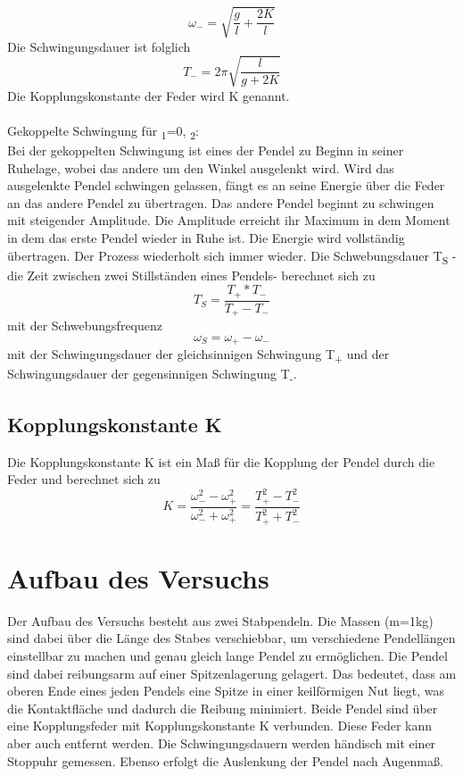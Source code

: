 \documentclass[titlepage=firstcover, captions=tableheading]{scrartcl}
\begin{document}
\begin{displaymath}
    \omega_-=\sqrt{\frac{g}{l}+\frac{2K}{l}}
\end{displaymath}
Die Schwingungsdauer ist folglich
\begin{displaymath}
    T_-=2\pi\sqrt{\frac{l}{g+2K}}
\end{displaymath}
Die Kopplungskonstante der Feder wird K genannt.
\\\\
Gekoppelte Schwingung für \alpha\textsubscript{1}=0, \alpha\textsubscript{2}:\\
Bei der gekoppelten Schwingung ist eines der Pendel zu Beginn in seiner Ruhelage, wobei das andere um den Winkel \alpha  ausgelenkt wird. Wird das ausgelenkte Pendel schwingen gelassen, fängt es an seine Energie über die Feder an das andere Pendel zu übertragen. Das andere Pendel beginnt zu schwingen mit steigender Amplitude. Die Amplitude erreicht ihr Maximum in dem Moment in dem das erste Pendel wieder in Ruhe ist. Die Energie wird vollständig übertragen. Der Prozess wiederholt sich immer wieder. Die Schwebungsdauer T\textsubscript{S} -die Zeit zwischen zwei Stillständen eines Pendels- berechnet sich zu 
\begin{displaymath}
    T_S=\frac{T_+*T_-}{T_+-T_-}
\end{displaymath}
mit der Schwebungsfrequenz
\begin{displaymath}
    \omega_S=\omega_+-\omega_-
\end{displaymath}
mit der Schwingungsdauer der gleichsinnigen Schwingung T\textsubscript{+} und der Schwingungsdauer der gegensinnigen Schwingung T\textsubscript{-}. \\
\subsection{Kopplungskonstante K}
\noindent Die Kopplungskonstante K ist ein Maß für die Kopplung der Pendel durch die Feder und berechnet sich zu 
\begin{displaymath}
    K=\frac{\omega_-^2-\omega_+^2}{\omega_-^2+\omega_+^2}=\frac{T_+^2-T_-^2}{T_+^2+T_-^2}
\end{displaymath}
\section{Aufbau des Versuchs}
\noindent Der Aufbau des Versuchs besteht aus zwei Stabpendeln. Die Massen (m=1kg) sind dabei über die Länge des Stabes verschiebbar, um verschiedene Pendellängen einstellbar zu machen und genau gleich lange Pendel zu ermöglichen. Die Pendel sind dabei reibungsarm auf einer Spitzenlagerung gelagert. Das bedeutet, dass am oberen Ende eines jeden Pendels eine Spitze in einer keilförmigen Nut liegt, was die Kontaktfläche und dadurch die Reibung minimiert. Beide Pendel sind über eine Kopplungsfeder mit Kopplungskonstante K verbunden. Diese Feder kann aber auch entfernt werden. Die Schwingungsdauern werden händisch mit einer Stoppuhr gemessen. Ebenso erfolgt die Auslenkung der Pendel nach Augenmaß. 
\end{document}
